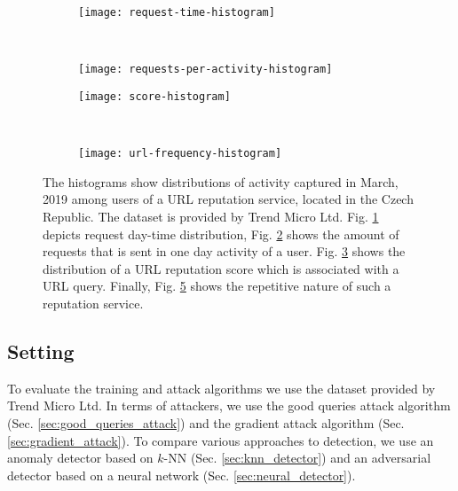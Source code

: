 \begin{figure}[!htb]
    \centering

        \begin{subfigure}[b]{0.45\textwidth}
            \texttt{[image: request-time-histogram]}
            \caption{}\label{fig:request-time-histogram}
        \end{subfigure}
        ~
        \begin{subfigure}[b]{0.45\textwidth}
            \texttt{[image: requests-per-activity-histogram]}
            \caption{}\label{fig:requests-per-activity-histogram}
        \end{subfigure}

        \begin{subfigure}[b]{0.45\textwidth}
            \texttt{[image: score-histogram]}
            \caption{}\label{fig:score-histogram}
        \end{subfigure}
        ~
        \begin{subfigure}[b]{0.45\textwidth}
            \texttt{[image: url-frequency-histogram]}
            \caption{}\label{fig:url-frequency-histogram}
        \end{subfigure}

    \caption{The histograms show distributions of activity captured in March, 2019 among users of a URL reputation service, located in the Czech Republic. The dataset is provided by Trend Micro Ltd. Fig. \ref{fig:request-time-histogram} depicts request day-time distribution, Fig. \ref{fig:requests-per-activity-histogram} shows the amount of requests that is sent in one day activity of a user. Fig. \ref{fig:score-histogram} shows the distribution of a URL reputation score which is associated with a URL query. Finally, Fig. \ref{fig:url-frequency-histogram} shows the repetitive nature of such a reputation service.}
\end{figure}


\subsection{Setting}
To evaluate the training and attack algorithms we use the dataset provided by Trend Micro Ltd. In terms of attackers, we use the good queries attack algorithm (Sec. \ref{sec:good_queries_attack}) and the gradient attack algorithm (Sec. \ref{sec:gradient_attack}). To compare various approaches to detection, we use an anomaly detector based on $k$-NN (Sec. \ref{sec:knn_detector}) and an adversarial detector based on a neural network (Sec. \ref{sec:neural_detector}).

